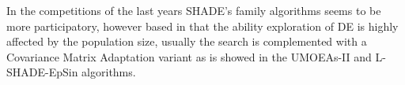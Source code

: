 In the competitions of the last years SHADE's family algorithms seems to be more participatory, however based in that the ability exploration of DE is highly affected by the population size, usually the search is complemented with a Covariance Matrix Adaptation variant as is showed in the UMOEAs-II and L-SHADE-EpSin algorithms.
%
%


